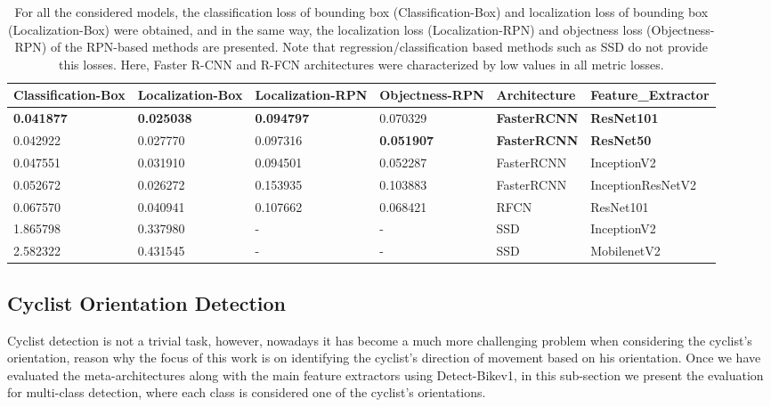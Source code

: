 \documentclass[journal]{IEEEtran}
\begin{document}
\begin{table*}[hb!]
\begin{minipage}[c]{0.95\textwidth}
\caption{For all the considered models, the classification loss of bounding box (Classification-Box) and localization loss of bounding box (Localization-Box) were obtained, and in the same way, the localization loss (Localization-RPN) and objectness loss (Objectness-RPN) of the RPN-based methods are presented. Note that regression/classification based methods such as SSD do not provide this losses. Here, Faster R-CNN  and R-FCN architectures were characterized by low values in all metric losses.
\label{table:Cyclist_Loss}}
\end{minipage}
\addtolength{\tabcolsep}{-1pt}
\begin{center}
\begin{tabular}{llllll}
\toprule
{Classification-Box} &  {Localization-Box}&  {Localization-RPN} & {Objectness-RPN} & Architecture &  Feature\_Extractor \\
\midrule
\textbf{0.041877} &      \textbf{0.025038} &  \textbf{0.094797} &   0.070329 &   \textbf{FasterRCNN} &          \textbf{ResNet101} \\
 0.042922 &      0.027770 &  0.097316 &   \textbf{0.051907} &   \textbf{FasterRCNN} &\textbf{ResNet50} \\
0.047551 &      0.031910 &  0.094501 &   0.052287 &   FasterRCNN &        InceptionV2 \\
0.052672 &      0.026272 &  0.153935 &   0.103883 &   FasterRCNN &  InceptionResNetV2 \\
0.067570 &      0.040941 &  0.107662 &   0.068421 &         RFCN &          ResNet101 \\
1.865798 &      0.337980 &         - &          - &          SSD &        InceptionV2 \\
2.582322 &      0.431545 &         - &          - &          SSD &        MobilenetV2 \\
\bottomrule
\end{tabular}
\end{center}
\end{table*}

\subsection{Cyclist Orientation Detection}
\label{sec:cyclistOrientationDetection}

Cyclist detection is not a trivial task, however, nowadays it has become a much more challenging problem when considering the cyclist's orientation, reason why the focus of this work is on identifying the cyclist's direction of movement based on his orientation. Once we have evaluated the meta-architectures along with the main feature extractors using Detect-Bikev1, in this sub-section we present the evaluation for multi-class detection, where each class is considered one of the cyclist's orientations.
\end{document}
